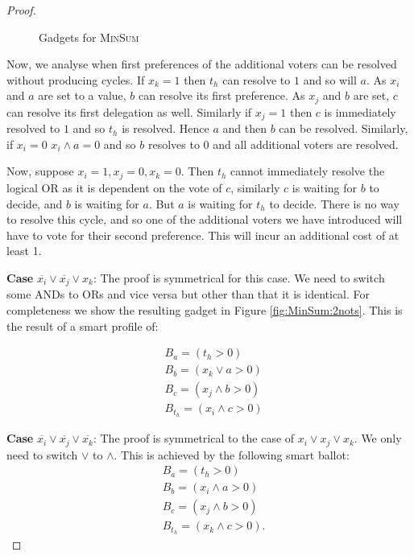 \documentclass[11pt,a4paper, titlepage]{article}
\theoremstyle{definition}
\begin{document}
\begin{proof}
\begin{figure}
{{\begin{tikzpicture}[edge from parent/.style={draw,-latex}, align=center,node distance=1.75cm]
        \end{tikzpicture}
        \label{fig:MinSum:2nots}
    }}
    \caption{Gadgets for \textsc{MinSum}}
    \label{fig:MinSum}
    \end{figure}
    
    Now, we analyse when first preferences of the additional voters can be resolved without producing cycles. 
    If $x_k = 1$ then $t_h$ can resolve to $1$ and so will $a$. 
    As $x_i$ and $a$ are set to a value, $b$ can resolve its first preference. 
    As $x_j$ and $b$ are set, $c$ can resolve its first delegation as well. 
    Similarly if $x_j = 1$ then $c$ is immediately resolved to $1$ and so $t_h$ is resolved. 
    Hence $a$ and then $b$ can be resolved. 
    Similarly, if $x_i = 0$ $x_i \land a = 0$ and so $b$ resolves to $0$ and all additional voters are resolved.
    
    Now, suppose $x_i = 1, x_j = 0, x_k = 0$. Then $t_h$ cannot immediately resolve the logical OR as it is dependent on the vote of $c$, similarly $c$ is waiting for $b$ to decide, and $b$ is waiting for $a$. 
    But $a$ is waiting for $t_h$ to decide. 
    There is no way to resolve this cycle, and so one of the additional voters we have introduced will have to vote for their second preference. 
    This will incur an additional cost of at least 1.

    \textbf{Case} $\overline{x_i} \lor \overline{x_j} \lor x_k$: 
    The proof is symmetrical for this case. We need to switch some ANDs to ORs and vice versa but other than that it is identical. 
    For completeness we show the resulting gadget in Figure \ref{fig:MinSum:2nots}. 
    This is the result of a smart profile of:

    \begin{align*}
        &B_a = (t_h > 0) \\
        &B_b = (x_k \lor a > 0) \\
        &B_c = (x_j \land b > 0) \\
        &B_{t_h} = (x_i \land c > 0)
    \end{align*}

    \textbf{Case} $\overline{x_i} \lor \overline{x_j} \lor \overline{x_k}$:
    The proof is symmetrical to the case of $x_i \lor x_j \lor x_k$. We only need to switch $\lor$ to $\land$. This is achieved by the following smart ballot:
    \begin{align*}
        &B_a = (t_h > 0) \\
        &B_b = (x_i \land a > 0) \\
        &B_c = (x_j \land b > 0) \\
        &B_{t_h} = (x_k \land c > 0).
    \end{align*}
    

\end{proof}
\end{document}
